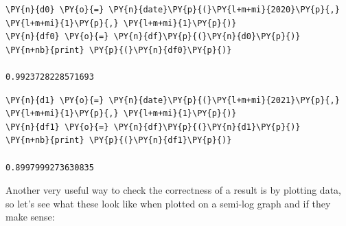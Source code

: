 \begin{tcolorbox}[breakable, size=fbox, boxrule=1pt, pad at break*=1mm,colback=cellbackground, colframe=cellborder]
\begin{Verbatim}[commandchars=\\\{\}]
\PY{n}{d0} \PY{o}{=} \PY{n}{date}\PY{p}{(}\PY{l+m+mi}{2020}\PY{p}{,} \PY{l+m+mi}{1}\PY{p}{,} \PY{l+m+mi}{1}\PY{p}{)}
\PY{n}{df0} \PY{o}{=} \PY{n}{df}\PY{p}{(}\PY{n}{d0}\PY{p}{)}
\PY{n+nb}{print} \PY{p}{(}\PY{n}{df0}\PY{p}{)}

0.9923728228571693
\end{Verbatim}
\end{tcolorbox}

\begin{tcolorbox}[breakable, size=fbox, boxrule=1pt, pad at break*=1mm,colback=cellbackground, colframe=cellborder]
\begin{Verbatim}[commandchars=\\\{\}]
\PY{n}{d1} \PY{o}{=} \PY{n}{date}\PY{p}{(}\PY{l+m+mi}{2021}\PY{p}{,} \PY{l+m+mi}{1}\PY{p}{,} \PY{l+m+mi}{1}\PY{p}{)}
\PY{n}{df1} \PY{o}{=} \PY{n}{df}\PY{p}{(}\PY{n}{d1}\PY{p}{)}
\PY{n+nb}{print} \PY{p}{(}\PY{n}{df1}\PY{p}{)}

0.8997999273630835
\end{Verbatim}
\end{tcolorbox}

Another very useful way to check the correctness of a result is by plotting data, so let's see what these look like when plotted on a semi-log graph and if they make sense:
    
